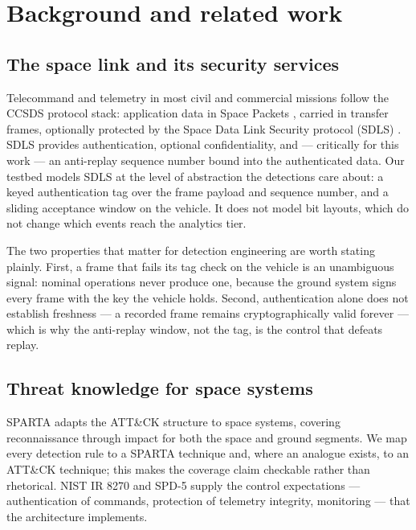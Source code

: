 \section{Background and related work}

\subsection{The space link and its security services}

Telecommand and telemetry in most civil and commercial missions follow the CCSDS
protocol stack: application data in Space Packets \cite{ccsds133spp}, carried in
transfer frames, optionally protected by the Space Data Link Security protocol
(SDLS) \cite{ccsds355sdls}. SDLS provides authentication, optional confidentiality,
and --- critically for this work --- an anti-replay sequence number bound into the
authenticated data. Our testbed models SDLS at the level of abstraction the
detections care about: a keyed authentication tag over the frame payload and
sequence number, and a sliding acceptance window on the vehicle. It does not
model bit layouts, which do not change which events reach the analytics tier.

The two properties that matter for detection engineering are worth stating
plainly. First, a frame that fails its tag check on the vehicle is an
unambiguous signal: nominal operations never produce one, because the ground
system signs every frame with the key the vehicle holds. Second, authentication
alone does not establish freshness --- a recorded frame remains cryptographically
valid forever --- which is why the anti-replay window, not the tag, is the
control that defeats replay.

\subsection{Threat knowledge for space systems}

SPARTA \cite{sparta} adapts the ATT\&CK \cite{attack} structure to space systems,
covering reconnaissance through impact for both the space and ground segments. We
map every detection rule to a SPARTA technique and, where an analogue exists, to
an ATT\&CK technique; this makes the coverage claim checkable rather than
rhetorical. NIST IR 8270 \cite{nistir8270} and SPD-5 \cite{spd5} supply the
control expectations --- authentication of commands, protection of telemetry
integrity, monitoring --- that the architecture implements.

